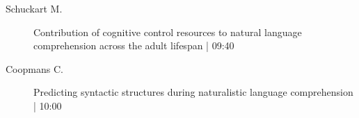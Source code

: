 \begin{symposium}
\begin{description}
                \item [ Schuckart M.] Contribution of cognitive control resources to natural language comprehension across the adult lifespan \textcolor{mygray}{ | 09:40}    
                
                \item [ Coopmans C.] Predicting syntactic structures during naturalistic language comprehension \textcolor{mygray}{ | 10:00}    
                
            \end{description} 
            \end{symposium}
            